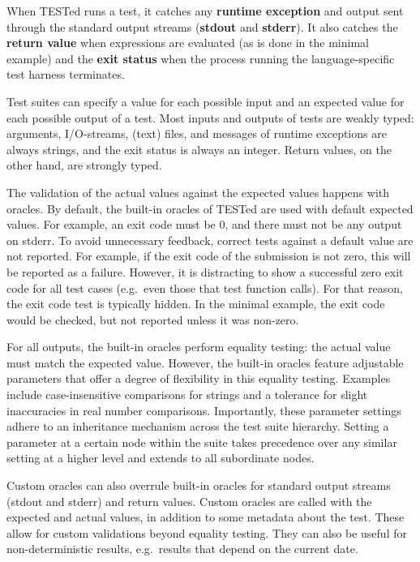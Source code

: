 \documentclass[../main]{subfiles}
\begin{document}
When TESTed runs a test, it catches any \textbf{runtime exception} and output sent through the standard output streams (\textbf{stdout} and \textbf{stderr}).
It also catches the \textbf{return value} when expressions are evaluated (as is done in the minimal example) and the \textbf{exit status} when the process running the language-specific test harness terminates.

Test suites can specify a value for each possible input and an expected value for each possible output of a test.
Most inputs and outputs of tests are weakly typed: arguments, I/O-streams, (text) files, and messages of runtime exceptions are always strings, and the exit status is always an integer.
Return values, on the other hand, are strongly typed.

The validation of the actual values against the expected values happens with oracles.
By default, the built-in oracles of TESTed are used with default expected values.
For example, an exit code must be 0, and there must not be any output on stderr.
To avoid unnecessary feedback, correct tests against a default value are not reported.
For example, if the exit code of the submission is not zero, this will be reported as a failure.
However, it is distracting to show a successful zero exit code for all test cases (e.g.\ even those that test function calls).
For that reason, the exit code test is typically hidden.
In the minimal example, the exit code would be checked, but not reported unless it was non-zero.

For all outputs, the built-in oracles perform equality testing: the actual value must match the expected value.
However, the built-in oracles feature adjustable parameters that offer a degree of flexibility in this equality testing.
Examples include case-insensitive comparisons for strings and a tolerance for slight inaccuracies in real number comparisons.
Importantly, these parameter settings adhere to an inheritance mechanism across the test suite hierarchy.
Setting a parameter at a certain node within the suite takes precedence over any similar setting at a higher level and extends to all subordinate nodes.

Custom oracles can also overrule built-in oracles for standard output streams (stdout and stderr) and return values.
Custom oracles are called with the expected and actual values, in addition to some metadata about the test.
These allow for custom validations beyond equality testing.
They can also be useful for non-deterministic results, e.g.\ results that depend on the current date.
\end{document}
